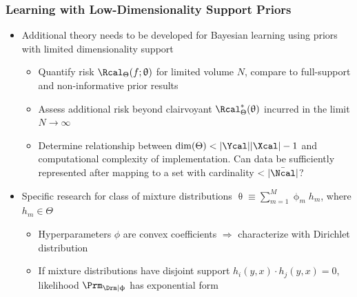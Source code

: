 \documentclass[aspectratio=169,usenames,dvipsnames]{beamer}
\begin{document}
\begin{frame}
\frametitle{Learning with Low-Dimensionality Support Priors}

\begin{itemize}
\item Additional theory needs to be developed for Bayesian learning using priors with limited dimensionality support
\vspace{0.25em}
	\vspace{0.25em}
	\begin{itemize}
	\item Quantify risk $\Rcal_{\Theta}(f ; \uptheta)$ for \alert{limited volume $N$}, compare to full-support and non-informative prior results
	\vspace{0.25em}
	\item Assess additional risk beyond clairvoyant $\Rcal_{\Theta}^*(\uptheta)$ incurred in the limit $N \to \infty$
	\vspace{0.25em}
	\item Determine relationship between $\dim(\Theta) < |\Ycal||\Xcal| - 1$ and \alert{computational complexity} of implementation. Can data be sufficiently represented after mapping to a set with cardinality $< |\bar{\Ncal}|$?
	\end{itemize}
\vspace{0.5em}
\item Specific research for class of mixture distributions $\uptheta \equiv \sum_{m = 1}^M \upphi_m h_m$, where $h_m \in \Theta$
	\vspace{0.25em}
	\begin{itemize}
	\item Hyperparameters $\phi$ are convex coefficients $\Rightarrow$ characterize with Dirichlet distribution
	\vspace{0.25em}
	\item If mixture distributions have disjoint support $h_i(y,x) \cdot h_j(y,x) = 0$, likelihood $\Prm_{\Drm | \upphi}$ has \alert{exponential form}
	\end{itemize}

\end{itemize}

\end{frame}
\end{document}
